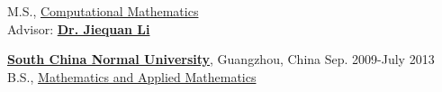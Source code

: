 \documentclass[12pt]{article}
\renewcommand{\section}[1]{\pagebreak[3]%
    \hyphenpenalty=10000%
    \vspace{1.3\baselineskip}%
    \phantomsection\addcontentsline{toc}{section}{#1}%
    \noindent\llap{\scshape\smash{\parbox[t]{\marginparwidth}{\raggedright #1}}}%
    \vspace{-\baselineskip}\par}
\newenvironment{outerlist}[1][\enskip\textbullet]%
        {\begin{itemize}[#1,leftmargin=*]}{\end{itemize}%
         \vspace{-.6\baselineskip}}
\newenvironment{innerlist}[1][\enskip\textbullet]%
        {\begin{itemize}[#1,leftmargin=*,parsep=0pt,itemsep=0pt,topsep=0pt,partopsep=0pt]}
        {\end{itemize}}
\begin{document}
M.S.,
        \href{http://math.english.bnu.edu.cn/}
           {Computational Mathematics}
       \\
Advisor:
             \href{http://math0.bnu.edu.cn/~lijiequan/}
                  {\textbf{Dr. Jiequan Li}} 
                
\vspace{.1in}
\href{http://english.scnu.edu.cn/}{\textbf{South China Normal University}},
Guangzhou, China \hfill Sep. 2009-July 2013\\
B.S.,
        \href{http://maths.scnu.edu.cn/}
             {Mathematics and Applied Mathematics} \\


\end{document}
